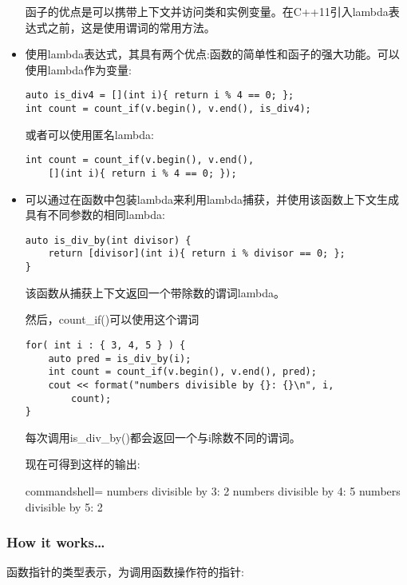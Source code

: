 \begin{itemize}
函子的优点是可以携带上下文并访问类和实例变量。在C++11引入lambda表达式之前，这是使用谓词的常用方法。

\item 
使用lambda表达式，其具有两个优点:函数的简单性和函子的强大功能。可以使用lambda作为变量:

\begin{lstlisting}[style=styleCXX]
auto is_div4 = [](int i){ return i % 4 == 0; };
int count = count_if(v.begin(), v.end(), is_div4);
\end{lstlisting}

或者可以使用匿名lambda:

\begin{lstlisting}[style=styleCXX]
int count = count_if(v.begin(), v.end(),
	[](int i){ return i % 4 == 0; });
\end{lstlisting}

\item 
可以通过在函数中包装lambda来利用lambda捕获，并使用该函数上下文生成具有不同参数的相同lambda:

\begin{lstlisting}[style=styleCXX]
auto is_div_by(int divisor) {
	return [divisor](int i){ return i % divisor == 0; };
}
\end{lstlisting}

该函数从捕获上下文返回一个带除数的谓词lambda。

然后，count\_if()可以使用这个谓词

\begin{lstlisting}[style=styleCXX]
for( int i : { 3, 4, 5 } ) {
	auto pred = is_div_by(i);
	int count = count_if(v.begin(), v.end(), pred);
	cout << format("numbers divisible by {}: {}\n", i,
		count);
}
\end{lstlisting}

每次调用is\_div\_by()都会返回一个与i除数不同的谓词。

现在可得到这样的输出:

\begin{tcblisting}{commandshell={}}
numbers divisible by 3: 2
numbers divisible by 4: 5
numbers divisible by 5: 2
\end{tcblisting}
\end{itemize}

\subsubsection{How it works…}

函数指针的类型表示，为调用函数操作符的指针:

